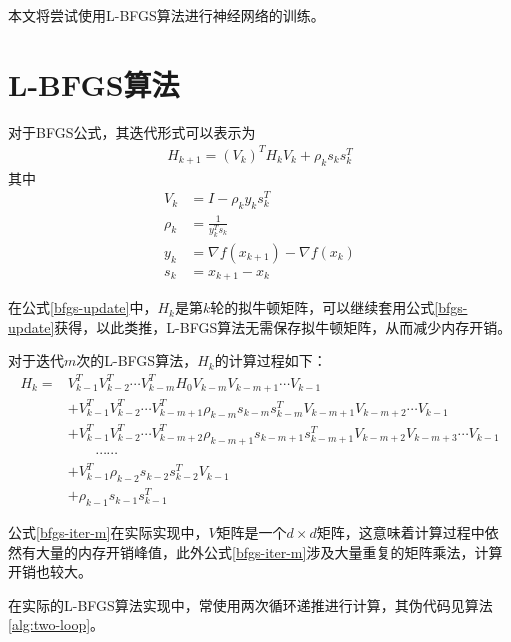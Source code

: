 \documentclass{article}
\begin{document}
本文将尝试使用L-BFGS算法进行神经网络的训练。

\section{L-BFGS算法}

对于BFGS公式，其迭代形式可以表示为
\begin{align}
H_{k+1} = (V_k)^T H_k V_k + \rho_k s_k s_k^T
\label{bfgs-update}
\end{align}
其中
\begin{align*}
V_k &= I - \rho_k y_k s_k^T\\
\rho_k &= \frac{1}{y_k^T s_k}\\
y_k &= \nabla f(x_{k+1}) - \nabla f(x_k)\\
s_k &= x_{k+1} - x_k
\end{align*}

在公式\ref{bfgs-update}中，$H_k$是第$k$轮的拟牛顿矩阵，可以继续套用公式\ref{bfgs-update}获得，以此类推，L-BFGS算法无需保存拟牛顿矩阵，从而减少内存开销。

对于迭代$m$次的L-BFGS算法，$H_{k}$的计算过程如下：
\begin{equation}
\begin{aligned}
H_{k} 
=& V_{k-1}^TV_{k-2}^T\cdots V_{k-m}^TH_0V_{k-m}V_{k-m+1}\cdots V_{k-1}\\
&+V_{k-1}^TV_{k-2}^T\cdots V_{k-m+1}^T\rho_{k-m}s_{k-m}s_{k-m}^TV_{k-m+1}V_{k-m+2}\cdots V_{k-1}\\
&+V_{k-1}^TV_{k-2}^T\cdots V_{k-m+2}^T\rho_{k-m+1}s_{k-m+1}s_{k-m+1}^TV_{k-m+2}V_{k-m+3}\cdots V_{k-1}\\
&\quad\quad\cdots\cdots\\
&+V_{k-1}^T\rho_{k-2}s_{k-2}s_{k-2}^TV_{k-1}\\
&+\rho_{k-1}s_{k-1}s_{k-1}^T
\label{bfgs-iter-m}
\end{aligned}
\end{equation}

公式\ref*{bfgs-iter-m}在实际实现中，$V$矩阵是一个$d\times d$矩阵，这意味着计算过程中依然有大量的内存开销峰值，此外公式\ref*{bfgs-iter-m}涉及大量重复的矩阵乘法，计算开销也较大。

在实际的L-BFGS算法实现中，常使用两次循环递推进行计算，其伪代码见算法\ref{alg:two-loop}。
\end{document}
